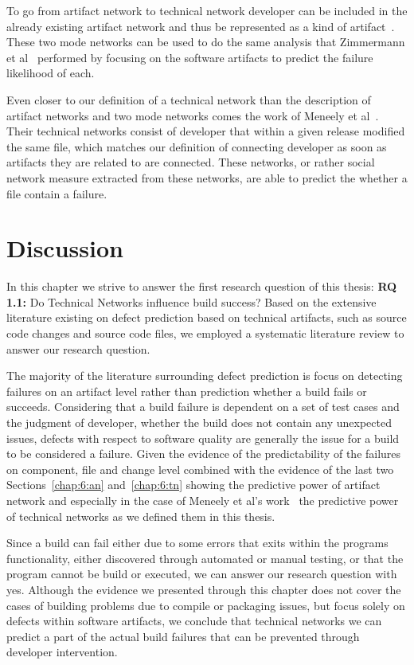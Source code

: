 To go from artifact network to technical network developer can be included in the already existing artifact network and thus be represented as a kind of artifact~\cite{pinzger:fse:2008}.
These two mode networks can be used to do the same analysis that Zimmermann et al~\cite{zimmermann:esem:2009,zimmermann:icse:2008} performed by focusing on the software artifacts to predict the failure likelihood of each.

Even closer to our definition of a technical network than the description of artifact networks and two mode networks comes the work of Meneely et al~\cite{meneely:fse:2008}.
Their technical networks consist of developer that within a given release modified the same file, which matches our definition of connecting developer as soon as artifacts they are related to are connected.
These networks, or rather social network measure extracted from these networks, are able to predict the whether a file contain a failure.

\section{Discussion}
\label{chap:6:dis}
In this chapter we strive to answer the first research question of this thesis:
\textbf{RQ 1.1:} Do Technical Networks influence build success?
Based on the extensive literature existing on defect prediction based on technical artifacts, such as source code changes and source code files, we employed a systematic literature review to answer our research question.

The majority of the literature surrounding defect prediction is focus on detecting failures on an artifact level rather than prediction whether a build fails or succeeds.
Considering that a build failure is dependent on a set of test cases and the judgment of developer, whether the build does not contain any unexpected issues, defects with respect to software quality are generally the issue for a build to be considered a failure.
Given the evidence of the predictability of the failures on component, file and change level combined with the evidence of the last two Sections~\ref{chap:6:an} and~\ref{chap:6:tn} showing the predictive power of artifact network and especially in the case of Meneely et al's work~\cite{meneely:fse:2008} the predictive power of technical networks as we defined them in this thesis.

Since a build can fail either due to some errors that exits within the programs functionality, either discovered through automated or manual testing, or that the program cannot be build or executed, we can answer our research question with yes.
Although the evidence we presented through this chapter does not cover the cases of building problems due to compile or packaging issues, but focus solely on defects within software artifacts, we conclude that technical networks we can predict a part of the actual build failures that can be prevented through developer intervention.







